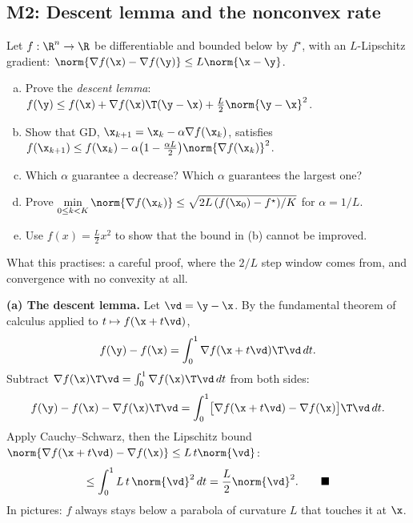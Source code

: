 \subsection{M2: Descent lemma and the nonconvex rate}

\begin{frame}{}
  \begin{probbox}
    Let $f:\R^n\to\R$ be differentiable and bounded below by $f^\star$, with an
    $L$-Lipschitz gradient: $\norm{\nabla f(\x)-\nabla f(\y)} \le L\norm{\x-\y}$.
    \begin{enumerate}[(a)]
      \item Prove the \emph{descent lemma}:
            $f(\y) \le f(\x) + \nabla f(\x)\T(\y-\x) + \tfrac L2\norm{\y-\x}^2$.
      \item Show that GD, $\x_{k+1} = \x_k - \alpha\nabla f(\x_k)$, satisfies
            $f(\x_{k+1}) \le f(\x_k) - \alpha\bigl(1-\tfrac{\alpha L}{2}\bigr)\norm{\nabla f(\x_k)}^2$.
      \item Which $\alpha$ guarantee a decrease? Which $\alpha$ guarantees the largest one?
      \item Prove $\displaystyle\min_{0\le k<K}\norm{\nabla f(\x_k)} \le \sqrt{2L\,(f(\x_0)-f^\star)/K}$ for $\alpha = 1/L$.
      \item Use $f(x) = \tfrac L2 x^2$ to show that the bound in (b) cannot be improved.
    \end{enumerate}
  \end{probbox}
  \footnotesize\textcolor{mGrey}{What this practises: a careful proof, where the $2/L$ step window comes from,
  and convergence with no convexity at all.}
\end{frame}

\begin{frame}{}
  \textbf{(a) The descent lemma.} Let $\vd = \y - \x$. By the fundamental theorem of calculus applied to
  $t\mapsto f(\x + t\vd)$,
  \[
    f(\y) - f(\x) = \int_0^1 \nabla f(\x + t\vd)\T\vd \,dt .
  \]
  Subtract $\nabla f(\x)\T\vd = \int_0^1 \nabla f(\x)\T\vd\,dt$ from both sides:
  \[
    f(\y) - f(\x) - \nabla f(\x)\T\vd
    = \int_0^1 \bigl[\nabla f(\x + t\vd) - \nabla f(\x)\bigr]\T\vd \,dt .
  \]
  Apply Cauchy--Schwarz, then the Lipschitz bound $\norm{\nabla f(\x+t\vd)-\nabla f(\x)} \le L\,t\norm{\vd}$:
  \[
    \le \int_0^1 L\,t\,\norm{\vd}^2\,dt = \frac L2\norm{\vd}^2 .
    \qquad\blacksquare
  \]
  \small\textcolor{mGrey}{In pictures: $f$ always stays below a parabola of curvature $L$ that touches it at $\x$.}
\end{frame}

